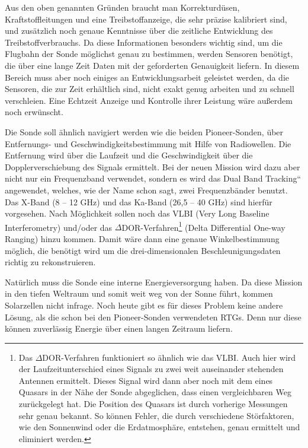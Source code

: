 Aus den oben genannten Gr\"unden braucht man Korrekturd\"usen,
Kraftstoffleitungen und eine Treibstoffanzeige, die sehr pr\"azise
kalibriert sind, und zus\"atzlich noch genaue Kennt\-nisse \"uber die
zeitliche Entwicklung des Treibstoffverbrauchs. Da diese Informationen
be\-sonders wichtig sind, um die Flugbahn der Sonde m\"oglichst genau
zu bestimmen, werden Sensoren ben\"otigt, die \"uber eine lange Zeit
Daten mit der geforderten Genauigkeit liefern. In diesem Bereich muss
aber noch einiges an Entwicklungsarbeit geleistet werden, da die
Sensoren, die zur Zeit erh\"altlich sind, nicht exakt genug arbeiten
und zu schnell verschlei\-{\ss}en. Eine Echtzeit Anzeige und Kontrolle
ihrer Leistung w\"are au{\ss}erdem noch erw\"unscht.




Die Sonde soll \"ahnlich navigiert werden wie die beiden Pioneer-Sonden,
\"uber Entfernungs- und Geschwindigkeitsbestimmung mit Hilfe von
Radiowellen. Die Entfernung wird \"uber die Laufzeit und die
Geschwindigkeit \"uber die Dopplerverschiebung des Signals ermittelt.
Bei der neuen Mission wird dazu aber nicht nur ein Frequenzband
verwendet, sondern es wird das {\quotedblbase}Dual Band Tracking``
angewendet, welches, wie der Name schon sagt, zwei Fre\-quenzb\"ander
benutzt. Das X-Band (8 -- 12 GHz) und das Ka-Band (26,5 -- 40 GHz) sind
hierf\"ur vorgesehen. Nach M\"oglichkeit sollen noch das
VLBI (Very Long
Baseline Interfe\-rometry) und/oder das $\Delta
$DOR-Verfahren\footnote{Das $\Delta $DOR-Verfahren\cite{delta} funktioniert
so \"ahnlich wie das VLBI. Auch hier wird der Laufzeitunterschied eines
Signals zu zwei weit auseinander stehenden Antennen ermittelt. Dieses
Signal wird dann aber noch mit dem eines Quasars in der N\"ahe der
Sonde abgeglichen, dass einen vergleichbaren Weg zur\"uckgelegt hat.
Die Position des Quasars ist durch vorherige Messungen sehr genau
bekannt. So k\"onnen Fehler, die durch verschiedene St\"orfaktoren, wie
den Sonnenwind oder die Erdatmosph\"are, entstehen, genau ermittelt und
eliminiert werden.} (Delta Differential One-way Ranging) hinzu kommen.
Damit w\"are dann eine genaue Winkelbestimmung m\"oglich, die
ben\"otigt wird um die drei-dimensionalen Beschleunigungsdaten richtig
zu rekonstruieren.


Nat\"urlich muss die Sonde eine interne Energieversorgung haben. Da
diese Mission in den tiefen Weltraum und somit weit weg von der Sonne
f\"uhrt, kommen Solarzellen nicht in\-frage. Noch heute gibt es f\"ur
dieses Problem keine andere L\"osung, als die schon bei den
Pioneer-Sonden verwendeten RTGs. Denn nur diese k\"onnen zuverl\"assig
Energie \"uber einen langen Zeitraum liefern.



